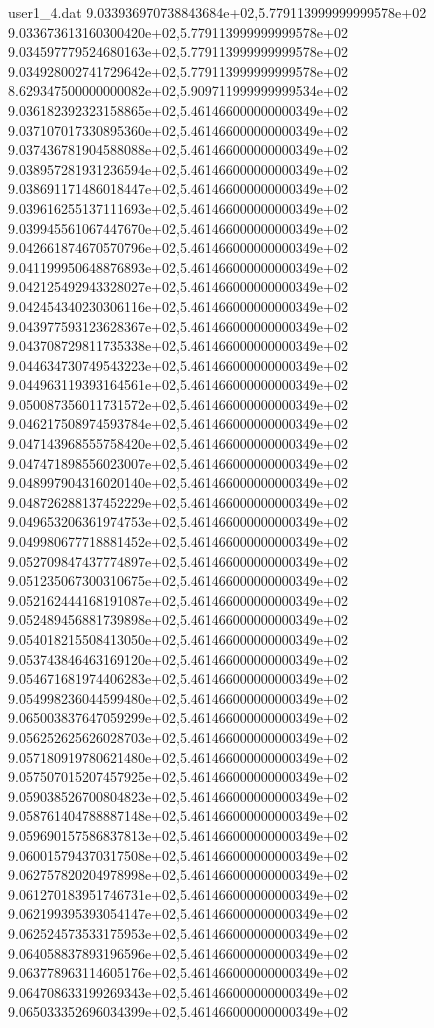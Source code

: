 \begin{filecontents}{user1_4.dat}
9.033936970738843684e+02,5.779113999999999578e+02
9.033673613160300420e+02,5.779113999999999578e+02
9.034597779524680163e+02,5.779113999999999578e+02
9.034928002741729642e+02,5.779113999999999578e+02
8.629347500000000082e+02,5.909711999999999534e+02
9.036182392323158865e+02,5.461466000000000349e+02
9.037107017330895360e+02,5.461466000000000349e+02
9.037436781904588088e+02,5.461466000000000349e+02
9.038957281931236594e+02,5.461466000000000349e+02
9.038691171486018447e+02,5.461466000000000349e+02
9.039616255137111693e+02,5.461466000000000349e+02
9.039945561067447670e+02,5.461466000000000349e+02
9.042661874670570796e+02,5.461466000000000349e+02
9.041199950648876893e+02,5.461466000000000349e+02
9.042125492943328027e+02,5.461466000000000349e+02
9.042454340230306116e+02,5.461466000000000349e+02
9.043977593123628367e+02,5.461466000000000349e+02
9.043708729811735338e+02,5.461466000000000349e+02
9.044634730749543223e+02,5.461466000000000349e+02
9.044963119393164561e+02,5.461466000000000349e+02
9.050087356011731572e+02,5.461466000000000349e+02
9.046217508974593784e+02,5.461466000000000349e+02
9.047143968555758420e+02,5.461466000000000349e+02
9.047471898556023007e+02,5.461466000000000349e+02
9.048997904316020140e+02,5.461466000000000349e+02
9.048726288137452229e+02,5.461466000000000349e+02
9.049653206361974753e+02,5.461466000000000349e+02
9.049980677718881452e+02,5.461466000000000349e+02
9.052709847437774897e+02,5.461466000000000349e+02
9.051235067300310675e+02,5.461466000000000349e+02
9.052162444168191087e+02,5.461466000000000349e+02
9.052489456881739898e+02,5.461466000000000349e+02
9.054018215508413050e+02,5.461466000000000349e+02
9.053743846463169120e+02,5.461466000000000349e+02
9.054671681974406283e+02,5.461466000000000349e+02
9.054998236044599480e+02,5.461466000000000349e+02
9.065003837647059299e+02,5.461466000000000349e+02
9.056252625626028703e+02,5.461466000000000349e+02
9.057180919780621480e+02,5.461466000000000349e+02
9.057507015207457925e+02,5.461466000000000349e+02
9.059038526700804823e+02,5.461466000000000349e+02
9.058761404788887148e+02,5.461466000000000349e+02
9.059690157586837813e+02,5.461466000000000349e+02
9.060015794370317508e+02,5.461466000000000349e+02
9.062757820204978998e+02,5.461466000000000349e+02
9.061270183951746731e+02,5.461466000000000349e+02
9.062199395393054147e+02,5.461466000000000349e+02
9.062524573533175953e+02,5.461466000000000349e+02
9.064058837893196596e+02,5.461466000000000349e+02
9.063778963114605176e+02,5.461466000000000349e+02
9.064708633199269343e+02,5.461466000000000349e+02
9.065033352696034399e+02,5.461466000000000349e+02

\end{filecontents}
